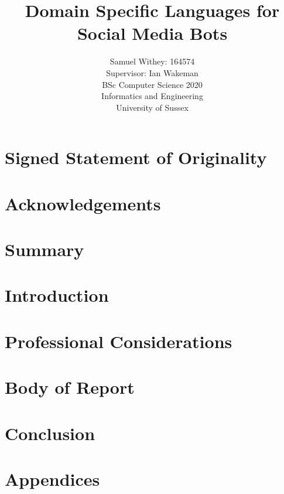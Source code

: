 \documentclass{article}
\title{ \LARGE Domain Specific Languages for Social Media Bots}
\author{Samuel Withey: 164574 \\
    Supervisor: Ian Wakeman \\
    BSc Computer Science 2020 \\
    Informatics and Engineering \\
    University of Sussex}
\date{}
\begin{document}
\maketitle

\newpage

\section{Signed Statement of Originality}

\newpage

\section{Acknowledgements}

\newpage

\section{Summary}

\newpage

\tableofcontents

\newpage

\section{Introduction}

\newpage

\section{Professional Considerations}

\newpage

\section{Body of Report}

\newpage

\section{Conclusion}

\newpage



\newpage

\section{Appendices}
\end{document}
